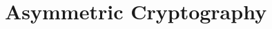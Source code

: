 \section{Asymmetric Cryptography}\label{sec:asymmetric_cryptography}
\vspace{7.5cm}




\vspace{-1.5mm}
\newpage
